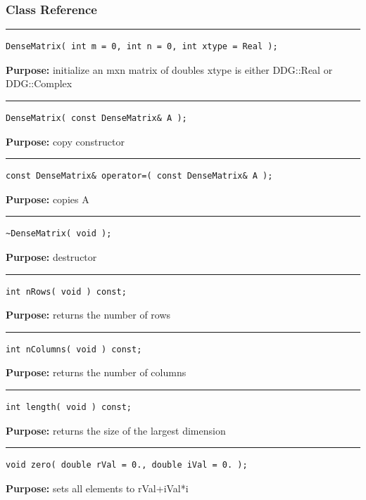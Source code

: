 \documentclass{article}
\begin{document}
\subsubsection{Class Reference}

\rule{5in}{1pt}
\begin{verbatim}
DenseMatrix( int m = 0, int n = 0, int xtype = Real );
\end{verbatim}
\textbf{Purpose:}
initialize an mxn matrix of doubles
xtype is either DDG::Real or DDG::Complex

\hspace{-.21in}\rule{5in}{1pt}
\begin{verbatim}
DenseMatrix( const DenseMatrix& A );
\end{verbatim}
\textbf{Purpose:}
copy constructor

\hspace{-.21in}\rule{5in}{1pt}
\begin{verbatim}
const DenseMatrix& operator=( const DenseMatrix& A );
\end{verbatim}
\textbf{Purpose:}
copies A

\hspace{-.21in}\rule{5in}{1pt}
\begin{verbatim}
~DenseMatrix( void );
\end{verbatim}
\textbf{Purpose:}
destructor

\hspace{-.21in}\rule{5in}{1pt}
\begin{verbatim}
int nRows( void ) const;
\end{verbatim}
\textbf{Purpose:}
returns the number of rows

\hspace{-.21in}\rule{5in}{1pt}
\begin{verbatim}
int nColumns( void ) const;
\end{verbatim}
\textbf{Purpose:}
returns the number of columns

\hspace{-.21in}\rule{5in}{1pt}
\begin{verbatim}
int length( void ) const;
\end{verbatim}
\textbf{Purpose:}
returns the size of the largest dimension

\hspace{-.21in}\rule{5in}{1pt}
\begin{verbatim}
void zero( double rVal = 0., double iVal = 0. );
\end{verbatim}
\textbf{Purpose:}
sets all elements to rVal+iVal*i
\end{document}
